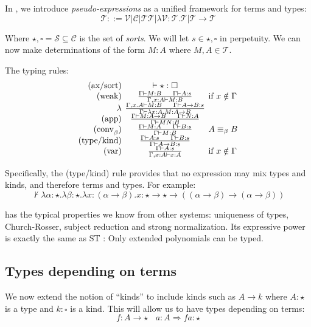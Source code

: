 In \wlo, we introduce \emph{pseudo-expressions} as a unified framework for terms and types:
\[
\mathcal{T} ::= \mathcal{V} | \mathcal{C} | \mathcal{TT} | \lambda \mathcal{V} : \mathcal{T. T} | \mathcal{T \to T}
\]

Where ${\star, \square} = \mathcal{S} \subseteq \mathcal{C}$ is the set of \emph{sorts}. We will let $s\in {\star, \square}$ in
perpetuity.
We can now make determinations of the form $M : A$ where $M, A \in \mathcal{T}$.

The typing rules:
\begin{equation}
\begin{array}{r@{\hspace{0.4em}}c@{\hspace{0.4em}}l}
\text{(ax/sort)}&\vdash \star : \square& \\
\text{(weak)}&\frac{\Gamma \vdash M : B~~~~\Gamma \vdash A : s}{\Gamma, x: A \vdash M : B}& \text{if } x \notin \Gamma \\
\lambda&\frac{\Gamma, x. A \vdash M : B~~~~\Gamma \vdash A \to B : s}{\Gamma \vdash \lambda x: A. M : A \to B}& \\
\text{(app)}&\frac{\Gamma \vdash M : A \to B~~~~\Gamma \vdash N : A}{\Gamma \vdash MN : B}&\\
\text{(conv}_\beta\text{)}&\frac{\Gamma \vdash M : A~~~~\Gamma \vdash B : s}{\Gamma \vdash M : B}&A \equiv_\beta B \\
\text{(type/kind)}&\frac{\Gamma \vdash A : s~~~~\Gamma \vdash B : s}{\Gamma \vdash A \to B : s}&\\
\text{(var)}&\frac{\Gamma \vdash A : s}{\Gamma, x: A \vdash x : A}&\text{if } x \notin \Gamma
\end{array}
\end{equation}


Specifically, the (type/kind) rule provides that no expression may mix types and kinds, and therefore terms and types.
For example:
\[
\not\vdash \lambda \alpha: \star. \lambda \beta: \star. \lambda x : (\alpha \to \beta). x: \star \to \star \to ((\alpha \to \beta) \to (\alpha \to \beta))
\]

\wlo has the typical properties we know from other systems: uniqueness of types, Church-Rosser, subject reduction and strong normalization.
Its expressive power is exactly the same as ST \lc: Only extended polynomials can be typed.

\subsection{Types depending on terms}
We now extend the notion of ``kinds'' to include kinds such as $A \to k$ where $A : \star$ is a type and $k : \square$ is a kind.
This will allow us to have types depending on terms:
\[
f : A \to \star~~~~a: A \Rightarrow f a : \star
\]

